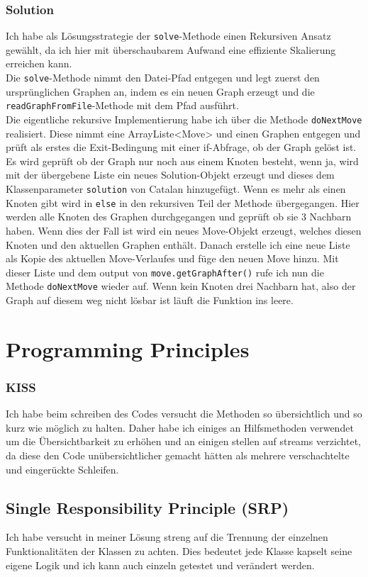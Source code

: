 \documentclass[12pt,a4paper]{article}
\begin{document}
\subsubsection{Solution}
Ich habe als Lösungsstrategie der \texttt{solve}-Methode einen Rekursiven Ansatz gewählt, da ich hier mit überschaubarem Aufwand eine effiziente Skalierung erreichen kann.\\
Die \texttt{solve}-Methode nimmt den Datei-Pfad entgegen und legt zuerst den ursprünglichen Graphen an, indem es ein neuen Graph erzeugt und die \texttt{readGraphFromFile}-Methode mit dem Pfad ausführt.\\
Die eigentliche rekursive Implementierung habe ich über die Methode \texttt{doNextMove} realisiert. Diese nimmt eine ArrayListe<Move> und einen Graphen entgegen und prüft als erstes die Exit-Bedingung mit einer if-Abfrage, ob der Graph gelöst ist. Es wird geprüft ob der Graph nur noch aus einem Knoten besteht, wenn ja, wird mit der übergebene Liste ein neues Solution-Objekt erzeugt und dieses dem Klassenparameter \texttt{solution} von Catalan hinzugefügt. Wenn es mehr als einen Knoten gibt wird in \texttt{else} in den rekursiven Teil der Methode übergegangen. Hier werden alle Knoten des Graphen durchgegangen und geprüft ob sie 3 Nachbarn haben. Wenn dies der Fall ist wird ein neues Move-Objekt erzeugt, welches diesen Knoten und den aktuellen Graphen enthält. Danach erstelle ich eine neue Liste als Kopie des aktuellen Move-Verlaufes und füge den neuen Move hinzu. Mit dieser Liste und dem output von \texttt{move.getGraphAfter()} rufe ich nun die Methode \texttt{doNextMove} wieder auf. Wenn kein Knoten drei Nachbarn hat, also der Graph auf diesem weg nicht lösbar ist läuft die Funktion ins leere.

\section{Programming Principles}
\subsubsection*{KISS}
Ich habe beim schreiben des Codes versucht die Methoden so übersichtlich und so kurz wie möglich zu halten. Daher habe ich einiges an Hilfsmethoden verwendet um die Übersichtbarkeit zu erhöhen und an einigen stellen auf streams verzichtet, da diese den Code unübersichtlicher gemacht hätten als mehrere verschachtelte und eingerückte Schleifen.

\subsection*{Single Responsibility Principle (SRP)}
Ich habe versucht in meiner Lösung streng auf die Trennung der einzelnen Funktionalitäten der Klassen zu achten. Dies bedeutet jede Klasse kapselt seine eigene Logik und ich kann auch einzeln getestet und verändert werden.
\end{document}
